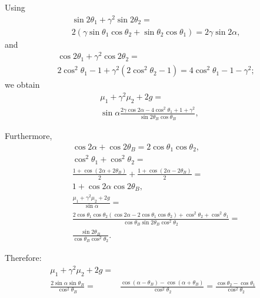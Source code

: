 \documentclass[preprint]{iucr}              %
\begin{document}
Using
\begin{align}
    &\sin2\theta_1+\gamma^2\sin2\theta_2 = \nonumber \\
    &2(\gamma\sin\theta_1\cos\theta_2+\sin\theta_2\cos\theta_1) =2\gamma\sin2\alpha,
\end{align}
and
\begin{align}
    &\cos2\theta_1+\gamma^2\cos2\theta_2=\nonumber \\
    &2\cos^2\theta_1-1+\gamma^2(2\cos^2\theta_2-1)=
    4\cos^2\theta_1-1-\gamma^2; 
\end{align}
we obtain
\begin{align}
    \mu_1+\gamma^2\mu_2+2g =& \nonumber \\
    \sin\alpha
    \frac{2\gamma\cos2\alpha-4\cos^2\theta_1+1+\gamma^2}{\sin2\theta_B\cos\theta_B}, \nonumber 
\end{align}  
    
    
Furthermore, 
\begin{align}
    &\cos2\alpha+\cos2\theta_B = 
    2\cos\theta_1\cos\theta_2, \nonumber \\
    & \cos^2\theta_1+\cos^2\theta_2 = \nonumber \\
    & \frac{1+\cos(2\alpha+2\theta_B)}{2} + 
    \frac{1+\cos(2\alpha-2\theta_B)}{2} = \nonumber \\
    & 1+\cos2\alpha\cos2\theta_B, \nonumber \\
    &\frac{\mu_1+\gamma^2\mu_2+2g}{\sin\alpha} = \nonumber \\
    & \frac{2\cos\theta_1\cos\theta_2(\cos2\alpha-2\cos\theta_1\cos\theta_2)+\cos^2\theta_2+\cos^2\theta_1}{\cos\theta_B\sin2\theta_B\cos^2\theta_2} = \nonumber \\
    & \frac{\sin2\theta_B}{\cos\theta_B\cos^2\theta_2}. \nonumber 
\end{align}

Therefore:
\begin{align}
    \mu_1+\gamma^2\mu_2+2g = & \nonumber \\
    \frac{2\sin\alpha\sin\theta_B}{\cos^2\theta_B} = &
    \frac{\cos(\alpha-\theta_B)-\cos(\alpha+\theta_B)}{\cos^2\theta_2}=
    \frac{\cos\theta_2-\cos\theta_1}{\cos^2\theta_2}
\end{align}





\end{document}
